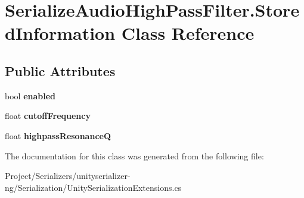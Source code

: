 \hypertarget{class_serialize_audio_high_pass_filter_1_1_stored_information}{}\section{Serialize\+Audio\+High\+Pass\+Filter.\+Stored\+Information Class Reference}
\label{class_serialize_audio_high_pass_filter_1_1_stored_information}
\subsection*{Public Attributes}
\begin{DoxyCompactItemize}
\item 
\mbox{\label{class_serialize_audio_high_pass_filter_1_1_stored_information_ada3d4428d4a6bfe685c7142dbb11d539}} 
bool {\bfseries enabled}
\item 
\mbox{\label{class_serialize_audio_high_pass_filter_1_1_stored_information_aecd4ab2cf0d5a9fe067f5b3cb1c5dd60}} 
float {\bfseries cutoff\+Frequency}
\item 
\mbox{\label{class_serialize_audio_high_pass_filter_1_1_stored_information_ac134dd438a45168c0e61f7a27285d2e7}} 
float {\bfseries highpass\+ResonanceQ}
\end{DoxyCompactItemize}


The documentation for this class was generated from the following file\+:\begin{DoxyCompactItemize}
\item 
Project/\+Serializers/unityserializer-\/ng/\+Serialization/Unity\+Serialization\+Extensions.\+cs\end{DoxyCompactItemize}
